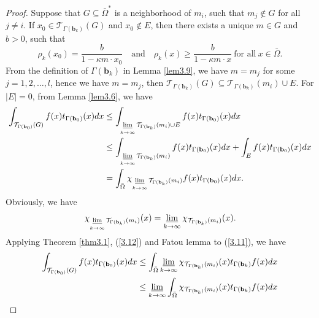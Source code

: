 \documentclass[a4paper,12pt,]{article}
\numberwithin{equation}{section}
\numberwithin{equation}{section} \allowdisplaybreaks
\begin{document}
\begin{proof}
  Suppose that $G \subseteq \bar{\Omega}^{\ast}$ is a neighborhood of $m_{i}$, such that $m_{j} \notin G$ for all $j \neq i$. If $x_{0} \in \mathcal{T}_{\Gamma({\mathbf{b}_{k}})}(G)$ and $x_{0} \notin E$, then there exists a unique $m \in G$ and $b >0$, such that
  $$\rho_{k}(x_{0}) = \frac{b}{1 - \kappa m \cdot x_{0}} \quad \text{and} \quad \rho_{k}(x) \geq \frac{b}{1 - \kappa m \cdot x}~\text{for all}~x \in \bar{\Omega}.$$
  From the definition of $\Gamma(\mathbf{b}_{k})$ in Lemma \ref{lem3.9}, we have $m = m_{j}$ for some $j = 1,2,\ldots,l$, hence we have $m = m_{j}$, then $\mathcal{T}_{\Gamma({\mathbf{b}_{k}})}(G) \subseteq \mathcal{T}_{\Gamma({\mathbf{b}_{k}})}(m_{i}) \cup E$. For $\vert E \vert = 0$, from Lemma \ref{lem3.6}, we have
  \begin{equation}\label{3.11}
    \begin{aligned}
    \int_{\mathcal{T}_{\Gamma({\mathbf{b}_{0}})}(G)}f(x)t_{\Gamma({\mathbf{b}_{0}})}(x)dx & \leq \int_{\varliminf\limits_{k \rightarrow \infty} \mathcal{T}_{\Gamma({\mathbf{b}_{k}})}(m_{i}) \cup E}f(x)t_{\Gamma({\mathbf{b}_{0}})}(x)dx \\
     & \leq \int_{\varliminf\limits_{k \rightarrow \infty} \mathcal{T}_{\Gamma({\mathbf{b}_{k}})}(m_{i})}f(x)t_{\Gamma({\mathbf{b}_{0}})}(x)dx + \int_{E}f(x)t_{\Gamma({\mathbf{b}_{0}})}(x)dx \\
     & = \int_{\bar{\Omega}}\chi_{\varliminf\limits_{k \rightarrow \infty} \mathcal{T}_{\Gamma({\mathbf{b}_{k}})}(m_{i})}f(x)t_{\Gamma({\mathbf{b}_{0}})}(x)dx.
  \end{aligned}
  \end{equation}
  Obviously, we have
  \begin{equation}\label{3.12}
   \chi_{\varliminf\limits_{k \rightarrow \infty} \mathcal{T}_{\Gamma({\mathbf{b}_{k}})}(m_{i})}(x) = \varliminf\limits_{k \rightarrow \infty} \chi_{\mathcal{T}_{\Gamma({\mathbf{b}_{k}})}(m_{i})}(x).
  \end{equation}
  Applying Theorem \ref{thm3.1}, (\ref{3.12}) and Fatou lemma to (\ref{3.11}), we have
  \begin{equation}\label{3.13}
    \begin{aligned}
    \int_{\mathcal{T}_{\Gamma({\mathbf{b}_{0}})}(G)}f(x)t_{\Gamma({\mathbf{b}_{0}})}(x)dx & \leq \int_{\bar{\Omega}}\varliminf\limits_{k \rightarrow \infty} \chi_{\mathcal{T}_{\Gamma({\mathbf{b}_{k}})}(m_{i})}(x)t_{\Gamma({\mathbf{b}_{k}})}f(x)dx \\
    & \leq \varliminf\limits_{k \rightarrow \infty} \int_{\bar{\Omega}}\chi_{\mathcal{T}_{\Gamma({\mathbf{b}_{k}})}(m_{i})}(x)t_{\Gamma({\mathbf{b}_{k}})}f(x)dx \\

\end{aligned}
\end{equation}
\end{proof}
\end{document}
